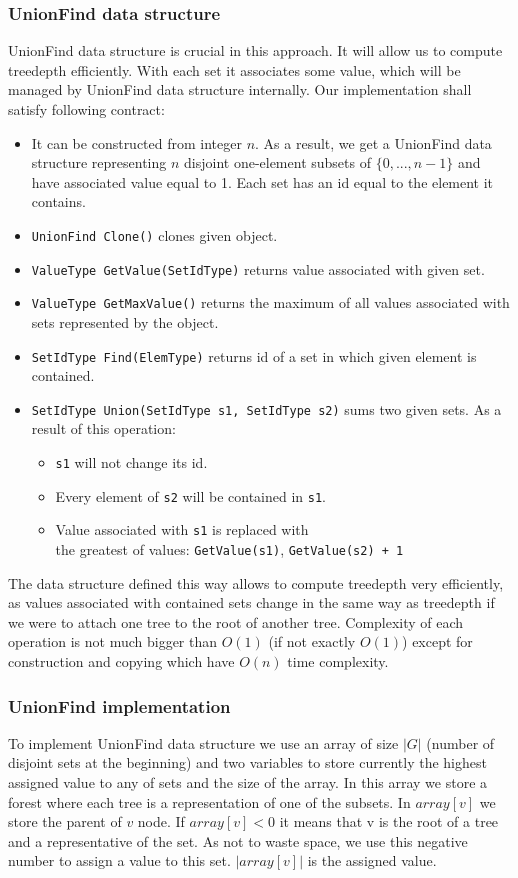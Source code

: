 \subsubsection{UnionFind data structure}
UnionFind data structure is crucial in this approach. It will allow us to compute treedepth efficiently. With each set it associates some value, which will be managed by UnionFind data structure internally. Our implementation shall satisfy following contract:
\begin{itemize}
	\item It can be constructed from integer $n$. As a result, we get a UnionFind data structure representing $n$ disjoint one-element subsets of $\{0,...,n-1\}$ and have associated value equal to 1. Each set has an id equal to the element it contains.
	\item \texttt{UnionFind Clone()} clones given object.
	\item \texttt{ValueType GetValue(SetIdType)} returns value associated with given set.
	\item \texttt{ValueType GetMaxValue()} returns the maximum of all values associated with sets represented by the object.
	\item \texttt{SetIdType Find(ElemType)} returns id of a set in which given element is contained.
	\item \texttt{SetIdType Union(SetIdType s1, SetIdType s2)} sums two given sets. As a result of this operation:
	\begin{itemize}
		\item \texttt{s1} will not change its id.
		\item Every element of \texttt{s2} will be contained in \texttt{s1}.
		\item Value associated with \texttt{s1} is replaced with \\ the greatest of values: \texttt{GetValue(s1)}, \texttt{GetValue(s2) + 1}
	\end{itemize}
\end{itemize}
The data structure defined this way allows to compute treedepth very efficiently, as values associated with contained sets change in the same way as treedepth if we were to attach one tree to the root of another tree. Complexity of each operation is not much bigger than $O(1)$ (if not exactly $O(1)$) except for construction and copying which have $O(n)$ time complexity.
\subsubsection{UnionFind implementation}
To implement UnionFind data structure we use an array of size $|G|$ (number of disjoint sets at the beginning) and two variables to store currently the highest assigned value to any of sets and the size of the array. In this array we store a forest where each tree is a representation of one of the subsets. In $array[v]$ we store the parent of $v$ node.
If $array[v] < 0$ it means that v is the root of a tree and a representative of the set. As not to waste space, we use this negative number to assign a value to this set. $|array[v]|$ is the assigned value.

